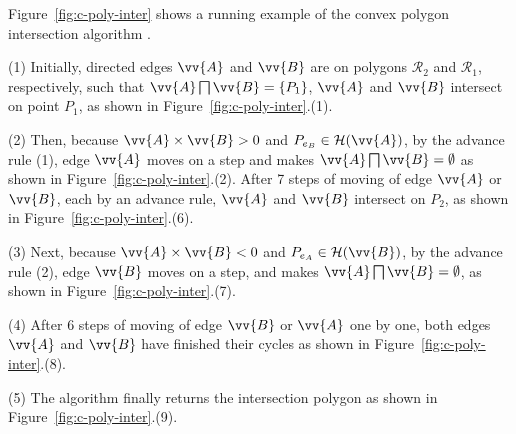 \begin{example}
Figure~\ref{fig:c-poly-inter} shows a running example of the convex polygon intersection algorithm \cpia.

\sstab(1) Initially, directed edges $\vv{A}$ and $\vv{B}$ are on polygons $\mathcal{R}_2$ and $\mathcal{R}_1$, respectively, such that $\vv{A} \bigsqcap \vv{B} = \{P_1\}$, \ie $\vv{A}$ and $\vv{B}$ intersect on point $P_1$, as shown in Figure~\ref{fig:c-poly-inter}.(1).

\sstab(2) Then, because $\vv{A} \times \vv{B} > 0$ and $P_{e_B} \in \mathcal{H}(\vv{A})$, by the advance rule (1), edge $\vv{A}$ moves on a step and makes $\vv{A} \bigsqcap \vv{B} = \emptyset$ as shown in Figure~\ref{fig:c-poly-inter}.(2).
After 7 steps of moving of edge $\vv{A}$ or $\vv{B}$, each by an advance rule, $\vv{A}$ and $\vv{B}$ intersect on $P_2$, as shown in Figure~\ref{fig:c-poly-inter}.(6).

\sstab(3) Next, because $\vv{A} \times \vv{B} < 0$ and $P_{e_A} \in \mathcal{H}(\vv{B})$, by the advance rule (2), edge $\vv{B}$ moves on a step, and makes $\vv{A} \bigsqcap \vv{B} = \emptyset$, as shown in Figure~\ref{fig:c-poly-inter}.(7).

\sstab(4) After 6 steps of moving of edge $\vv{B}$ or $\vv{A}$ one by one, both edges $\vv{A}$ and $\vv{B}$ have finished their cycles as shown in Figure~\ref{fig:c-poly-inter}.(8).

\sstab(5) The algorithm finally returns the intersection polygon as shown in Figure~\ref{fig:c-poly-inter}.(9). \eop
\end{example}










